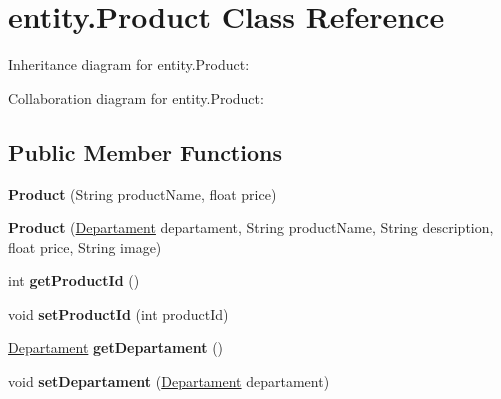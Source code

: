 \hypertarget{classentity_1_1_product}{}\section{entity.\+Product Class Reference}
\label{classentity_1_1_product}


Inheritance diagram for entity.\+Product\+:


Collaboration diagram for entity.\+Product\+:
\subsection*{Public Member Functions}
\begin{DoxyCompactItemize}
\item 
\mbox{\label{classentity_1_1_product_a16490d212d113e14eb833a18ffd35c9e}} 
{\bfseries Product} (String product\+Name, float price)
\item 
\mbox{\label{classentity_1_1_product_aac8d06cb1b251960fd960abec0ed08ce}} 
{\bfseries Product} (\mbox{\hyperlink{classentity_1_1_departament}{Departament}} departament, String product\+Name, String description, float price, String image)
\item 
\mbox{\label{classentity_1_1_product_a2d097a6e21ca5384407ef2d5629409d0}} 
int {\bfseries get\+Product\+Id} ()
\item 
\mbox{\label{classentity_1_1_product_ad9a9458cf69f508b1d80cd90f4649343}} 
void {\bfseries set\+Product\+Id} (int product\+Id)
\item 
\mbox{\label{classentity_1_1_product_a78bd5ae5f85a3d22bdd23b84c07f1ed4}} 
\mbox{\hyperlink{classentity_1_1_departament}{Departament}} {\bfseries get\+Departament} ()
\item 
\mbox{\label{classentity_1_1_product_aa67771d630e8eb1922b751a266df6a62}} 
void {\bfseries set\+Departament} (\mbox{\hyperlink{classentity_1_1_departament}{Departament}} departament)
\item 
\mbox{\label{classentity_1_1_product_a81d43916d1f7b73a2f087e3570d73de0}} 

\end{DoxyCompactItemize}

